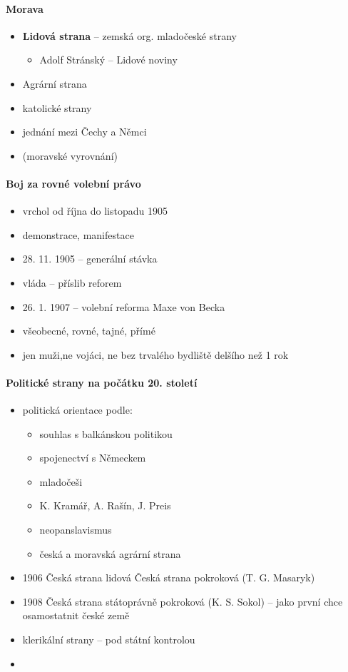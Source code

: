 \begin{itemize}
\paragraph{Morava}
\begin{itemize}
\item \textbf{Lidová strana} -- zemská org. mladočeské strany
	\begin{itemize}
	\item Adolf Stránský -- Lidové noviny
	\end{itemize}
\item Agrární strana
\item katolické strany
\item jednání mezi Čechy a Němci
\item {} (moravské vyrovnání)
\end{itemize}

\paragraph{Boj za rovné volební právo}
\begin{itemize}
\item vrchol od října do listopadu 1905
\item demonstrace, manifestace
\item 28. 11. 1905 -- generální stávka
\item vláda -- příslib reforem
\item 26. 1. 1907 -- volební reforma Maxe von Becka
\item všeobecné, rovné, tajné, přímé
\item jen muži,ne vojáci, ne bez trvalého bydliště delšího než 1 rok
\end{itemize}

\paragraph{Politické strany na počátku 20. století}
\begin{itemize}
\item politická orientace podle:
	\begin{itemize}
	\item souhlas s balkánskou politikou
	\item spojenectví s Německem
	\item mladočeši
	\item K. Kramář, A. Rašín, J. Preis
	\item neopanslavismus
	\item česká a moravská agrární strana
	\end{itemize}
\item 1906 Česká strana lidová \ra Česká strana pokroková (T. G. Masaryk)
\item 1908 Česká strana státoprávně pokroková (K. S. Sokol) -- jako první chce osamostatnit české země 
\item klerikální strany -- pod státní kontrolou
\item 
\end{itemize}


\end{itemize}
